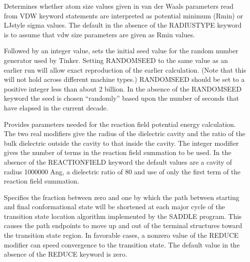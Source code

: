 \documentclass[letterpaper,11pt,english]{sphinxmanual}
\begin{document}
\ignorespaces {}\label{\detokenize{text/keywords:key-radiustype}}\begin{description}
\sphinxAtStartPar
Determines whether atom size values given in van der Waals parameters read from VDW keyword statements are interpreted as potential minimum (Rmin) or LJ\sphinxhyphen{}style sigma values. The default in the absence of the RADIUSTYPE keyword is to assume that vdw size parameters are given as Rmin values.

\end{description}

\ignorespaces {}\label{\detokenize{text/keywords:key-randomseed}}\begin{description}
\sphinxAtStartPar
Followed by an integer value, sets the initial seed value for the random number generator used by Tinker. Setting RANDOMSEED to the same value as an earlier run will allow exact reproduction of the earlier calculation. (Note that this will not hold across different machine types.) RANDOMSEED should be set to a positive integer less than about 2 billion. In the absence of the RANDOMSEED keyword the seed is chosen “randomly” based upon the number of seconds that have elapsed in the current decade.

\sphinxAtStartPar
Provides parameters needed for the reaction field potential energy calculation. The two real modifiers give the radius of the dielectric cavity and the ratio of the bulk dielectric outside the cavity to that inside the cavity. The integer modifier gives the number of terms in the reaction field summation to be used. In the absence of the REACTIONFIELD keyword the default values are a cavity of radius 1000000 Ang, a dielectric ratio of 80 and use of only the first term of the reaction field summation.

\end{description}

\ignorespaces {}\label{\detokenize{text/keywords:key-reduce}}\begin{description}
\sphinxAtStartPar
Specifies the fraction between zero and one by which the path between starting and final conformational state will be shortened at each major cycle of the transition state location algorithm implemented by the SADDLE program. This causes the path endpoints to move up and out of the terminal structures toward the transition state region. In favorable cases, a nonzero value of the REDUCE modifier can speed convergence to the transition state. The default value in the absence of the REDUCE keyword is zero.

\end{description}
\end{document}
